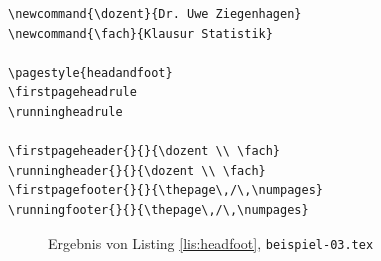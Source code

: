 \begin{lstlisting}[caption={Definition von Kopf und Fuß auf Titel- und Folgeseiten},label={lis:headfoot}]
\newcommand{\dozent}{Dr. Uwe Ziegenhagen}
\newcommand{\fach}{Klausur Statistik}
 
\pagestyle{headandfoot}
\firstpageheadrule
\runningheadrule

\firstpageheader{}{}{\dozent \\ \fach}
\runningheader{}{}{\dozent \\ \fach}
\firstpagefooter{}{}{\thepage\,/\,\numpages}
\runningfooter{}{}{\thepage\,/\,\numpages}
\end{lstlisting}


\begin{figure}[b]
\caption{Ergebnis von Listing \ref{lis:headfoot}, \texttt{beispiel-03.tex}}\label{fig:headfoot}
\end{figure}

